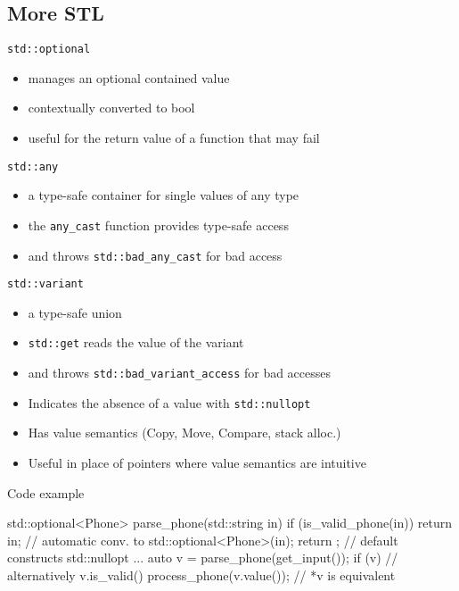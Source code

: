 \subsection{More STL}

\begin{frame}[fragile]
  \begin{block}{\texttt{std::optional}}
    \begin{itemize}
    \item manages an optional contained value
    \item contextually converted to bool
    \item useful for the return value of a function that may fail
    \end{itemize}
  \end{block}
  \begin{block}{\texttt{std::any}}
    \begin{itemize}
    \item a type-safe container for single values of any type
    \item the \texttt{any\_cast} function provides type-safe access
    \item and throws \texttt{std::bad\_any\_cast} for bad access
    \end{itemize}
  \end{block}
  \begin{block}{\texttt{std::variant}}
    \begin{itemize}
    \item a type-safe union
    \item \texttt{std::get} reads the value of the variant
    \item and throws \texttt{std::bad\_variant\_access} for bad accesses
    \end{itemize}
  \end{block}
\end{frame}

\begin{frame}[fragile]
  \begin{itemize}
  \item Indicates the absence of a value with \texttt{std::nullopt}
  \item Has value semantics (Copy, Move, Compare, stack alloc.)
  \item Useful in place of pointers where value semantics are intuitive
  \end{itemize}
  \begin{exampleblock}{Code example}
    \begin{cppcode*}{}
      std::optional<Phone> parse_phone(std::string in) {
        if (is_valid_phone(in)) {
          return in; // automatic conv. to std::optional<Phone>(in);
        }
        return {}; // default constructs std::nullopt
      }
      ...
      auto v = parse_phone(get_input());
      if (v) {  // alternatively v.is_valid()
        process_phone(v.value()); // *v is equivalent
      }
    \end{cppcode*}
  \end{exampleblock}
\end{frame}

